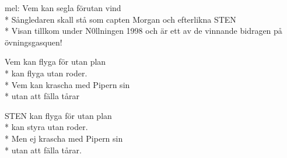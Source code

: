 \begin{SongText}[Sten]
    \begin{SongInfo}
        mel: Vem kan segla förutan vind\\*%
        Sångledaren skall stå som capten Morgan och efterlikna STEN\\*%
        Visan tillkom under N0llningen 1998 och är ett av de vinnande bidragen på övningsgasquen!
    \end{SongInfo}
    \begin{SongVerse}
        Vem kan flyga för utan plan\\*%
        kan flyga utan roder.\\*%
        Vem kan krascha med Pipern sin\\*%
        utan att fälla tårar
    \end{SongVerse}
    \begin{SongVerse}
        STEN kan flyga för utan plan\\*%
        kan styra utan roder.\\*%
        Men ej krascha med Pipern sin\\*%
        utan att fälla tårar.
    \end{SongVerse}
\end{SongText}

